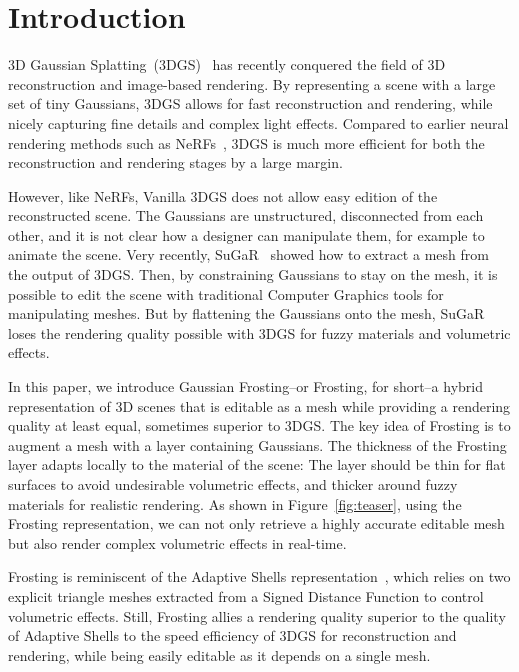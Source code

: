 \section{Introduction}

3D Gaussian Splatting~(3DGS)~\cite{kerbl3Dgaussians} has recently conquered the field of 3D reconstruction and image-based rendering. By representing a scene with a large set of tiny Gaussians, 3DGS allows for fast reconstruction and rendering, while nicely capturing fine details and complex light effects. Compared to earlier neural rendering methods such as NeRFs~\cite{mildenhall2020nerf}, 3DGS is 
much more efficient for both the reconstruction and rendering stages by a large margin. 


However, like NeRFs, Vanilla 3DGS does not allow easy edition of the reconstructed scene. The Gaussians are unstructured, disconnected from each other, and it is not clear how a designer can manipulate them, for example to animate the scene. Very recently, SuGaR~\cite{guedon2023sugar} showed how to extract a mesh from the output of 3DGS. Then, by constraining Gaussians to stay on the mesh, it is possible to edit the scene with traditional Computer Graphics tools for manipulating meshes. But by flattening the Gaussians onto the mesh, SuGaR loses the rendering quality possible with 3DGS for fuzzy materials and volumetric effects.


In this paper, we introduce Gaussian Frosting--or Frosting, for short--a hybrid representation of 3D scenes that is editable as a mesh while providing a rendering quality at least equal, sometimes superior to 3DGS. The key idea of Frosting is to augment a mesh with a layer containing Gaussians. The thickness of the Frosting layer adapts locally to the material of the scene: The layer should be thin for flat surfaces to avoid undesirable volumetric effects, and thicker around fuzzy materials for realistic rendering. As shown in Figure~\ref{fig:teaser}, using the Frosting representation, we can not only retrieve a highly accurate editable mesh but also render complex volumetric effects in real-time. 


Frosting is reminiscent of the Adaptive Shells representation~\cite{wang-siggraphasia2023-adaptive-shells}, which relies on two explicit triangle meshes extracted from a Signed Distance Function to control volumetric effects. Still, Frosting allies a rendering quality superior to the quality of Adaptive Shells to the speed efficiency of 3DGS for reconstruction and rendering, while being easily editable as it depends on a single mesh.


